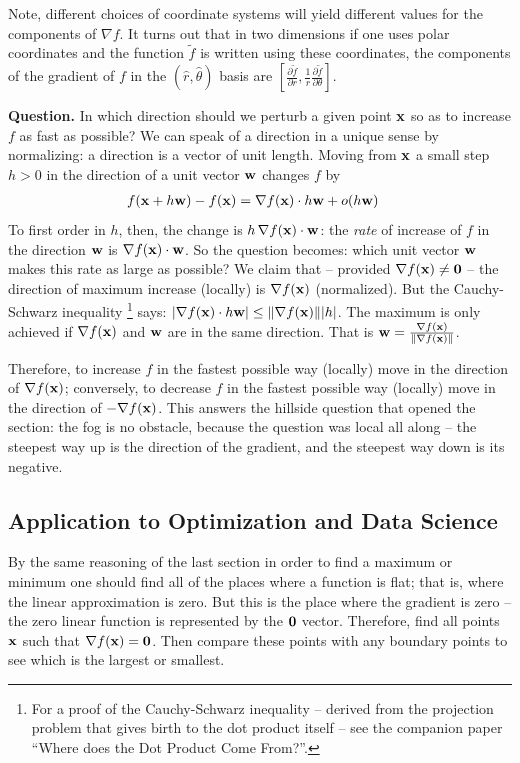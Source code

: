 \documentclass{article}
\begin{document}
Note, different choices of
coordinate systems will yield different
values for the components of $\nabla f$. It turns out that in two dimensions if one uses
polar coordinates and the function ${\tilde f}$ is written using these coordinates,
the components of the gradient of $f$ in the $(\hat r, \hat\theta)$ basis are
$\left[\frac{\partial {\tilde f}}{\partial r}, \frac{1}{r} \frac{\partial {\tilde f}}{\partial \theta}\right]$.

{\bf Question.} In which direction should we perturb a given point ${\bf x}$ so as
to increase $f$ as fast as possible? We can speak of a direction in a
unique sense by normalizing: a direction is a vector of unit length.
Moving from ${\bf x}$ a small step $h > 0$ in the direction of a unit
vector ${\bf w}$ changes $f$ by
\begin{align}
  f({\bf x} + h {\bf w})  - f({\bf x}) &= \nabla f({\bf x}) \cdot h {\bf w} + o(h {\bf w})
\end{align}
To first order in $h$, then, the change is $h \, \nabla f({\bf x}) \cdot {\bf w}$:
the {\em rate\/} of increase of $f$ in the direction ${\bf w}$ is
$\nabla f({\bf x}) \cdot {\bf w}$. So the question becomes: which unit
vector ${\bf w}$ makes this rate as large as possible?
We claim that -- provided $\nabla f({\bf x}) \neq {\bf 0}$ -- the direction of
maximum increase (locally) is $\nabla f({\bf x})$ (normalized).
But the Cauchy-Schwarz inequality%
\footnote{For a proof of the Cauchy-Schwarz inequality -- derived from the
projection problem that gives birth to the dot product itself -- see the
companion paper ``Where does the Dot Product Come From?''.}
says:
$|\nabla f({\bf x}) \cdot h{\bf w}| \le \|\nabla f({\bf x})\| |h|$.
The maximum is only achieved if $\nabla f({\bf x})$ and ${\bf w}$ are in the
same direction. That is ${\bf w} = \frac{\nabla f({\bf x})}{\|\nabla f({\bf x})\|}$.

Therefore, to increase $f$ in the fastest possible way (locally) move in the direction
of $\nabla f({\bf x})$; conversely, to decrease $f$ in the
fastest possible way (locally) move in the direction of $-\nabla f({\bf x})$.
This answers the hillside question that opened the section: the fog is no
obstacle, because the question was local all along -- the steepest way up
is the direction of the gradient, and the steepest way down is its
negative.

\subsection{Application to Optimization and Data Science}
By the same reasoning of the last section in order to find a maximum or minimum
one should find all of the places where a function is flat; that is, where the linear
approximation is zero. But this is the place where the gradient is zero -- the
zero linear function is represented by the ${\bf 0}$ vector. Therefore, find
all points ${\bf x}$ such that $\nabla f({\bf x}) = {\bf 0}$. Then compare
these points with any boundary points to see which is the largest or smallest.
\end{document}
